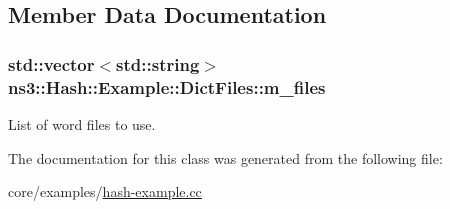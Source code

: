 \subsection{Member Data Documentation}
\subsubsection[{\texorpdfstring{m\+\_\+files}{m_files}}]{\setlength{\rightskip}{0pt plus 5cm}std\+::vector$<$std\+::string$>$ ns3\+::\+Hash\+::\+Example\+::\+Dict\+Files\+::m\+\_\+files\hspace{0.3cm}{\ttfamily [private]}}\hypertarget{classns3_1_1Hash_1_1Example_1_1DictFiles_a0f2c70e08b9eb66a95eb08637ddf6f92}{}\label{classns3_1_1Hash_1_1Example_1_1DictFiles_a0f2c70e08b9eb66a95eb08637ddf6f92}
List of word files to use. 

The documentation for this class was generated from the following file\+:\begin{DoxyCompactItemize}
\item 
core/examples/\hyperlink{hash-example_8cc}{hash-\/example.\+cc}\end{DoxyCompactItemize}
